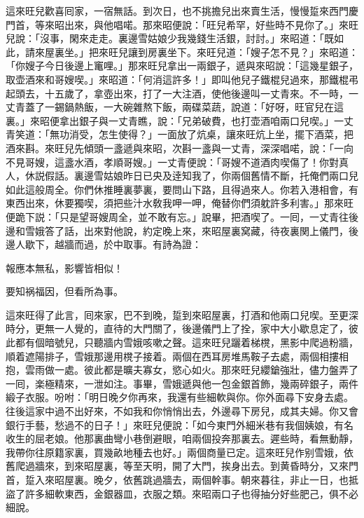 這來旺兒歡喜囘家，一宿無話。到次日，也不挑擔兒出來賣生活，慢慢踅來西門慶門首，等來昭出來，與他唱喏。那來昭便說：「旺兒希罕，好些時不見你了。」來旺兒說：「沒事，閑來走走。裏邊雪姑娘少我幾錢生活銀，討討。」來昭道：「既如此，請來屋裏坐。」把來旺兒讓到房裏坐下。來旺兒道：「嫂子怎不見？」來昭道：「你嫂子今日後邊上竃哩。」那來旺兒拿出一兩銀子，遞與來昭說：「這幾星銀子，取壶酒來和哥嫂喫。」來昭道：「何消這許多！」即叫他兒子鐵棍兒過來，那鐵棍弔起頭去，十五歲了，拿壺出來，打了一大注酒，使他後邊叫一丈青來。不一時，一丈青蓋了一錫鍋熱飯，一大碗雜熬下飯，兩碟菜蔬，說道：「好呀，旺官兒在這裏。」來昭便拿出銀子與一丈青瞧，說：「兄弟破費，也打壶酒咱兩口兒喫。」一丈青笑道：「無功消受，怎生使得？」一面放了炕桌，讓來旺炕上坐，擺下酒菜，把酒來斟。來旺兒先傾頭一盞遞與來昭，次斟一盞與一丈青，深深唱喏，說：「一向不見哥嫂，這盞水酒，孝順哥嫂。」一丈青便說：「哥嫂不道酒肉喫傷了！你對真人，休説假話。裏邊雪姑娘昨日已央及逹知我了，你兩個舊情不斷，托俺們兩口兒如此這般周全。你們休推睡裏夢裏，要問山下路，且得過來人。你若入港相會，有東西出來，休要獨喫，須把些汁水敎我呷一呷，俺替你們須躭許多利害。」那來旺便跪下説：「只是望哥嫂周全，並不敢有忘。」說畢，把酒喫了。一囘，一丈青往後邊和雪娥答了話，出來對他說，約定晚上來，來昭屋裏窝藏，待夜裏関上儀門，後邊人歇下，越牆而過，於中取事。有詩為證：

報應本無私，影響皆相似！

要知祸福因，但看所為事。

這來旺得了此言，囘來家，巴不到晚，踅到來昭屋裏，打酒和他兩口兒喫。至更深時分，更無一人覺的，直待的大門關了，後邊儀門上了拴，家中大小歇息定了，彼此都有個暗號兒，只聽牆内雪娥咳嗽之聲。這來旺兒躧着梯櫈，黑影中爬過粉牆，順着遮陽排子，雪娥那邊用櫈子接着。兩個在西耳房堆馬鞍子去處，兩個相摟相抱，雲雨做一處。彼此都是曠夫寡女，慾心如火。那來旺兒纓鎗強壯，儘力盤弄了一囘，楽極精來，一泄如注。事畢，雪娥遞與他一包金銀首飾，幾兩碎銀子，兩件緞子衣服。吩咐：「明日晚夕你再來，我還有些細軟與你。你外面尋下安身去處。往後這家中過不出好來，不如我和你悄悄出去，外邊尋下房兒，成其夫婦。你又會銀行手藝，愁過不的日子！」來旺兒便說：「如今東門外細米巷有我個姨娘，有名收生的屈老娘。他那裏曲彎小巷倒避眼，咱兩個投奔那裏去。遲些時，看無動靜，我帶你往原籍家裏，買幾畝地種去也好。」兩個商量已定。這來旺兒作别雪娥，依舊爬過牆來，到來昭屋裏，等至天明，開了大門，挨身出去。到黄昏時分，又來門首，踅入來昭屋裏。晚夕，依舊跳過牆去，兩個幹事。朝來暮往，非止一日，也抵盜了許多細軟東西，金銀器皿，衣服之類。來昭兩口子也得抽分好些肥己，俱不必細說。


